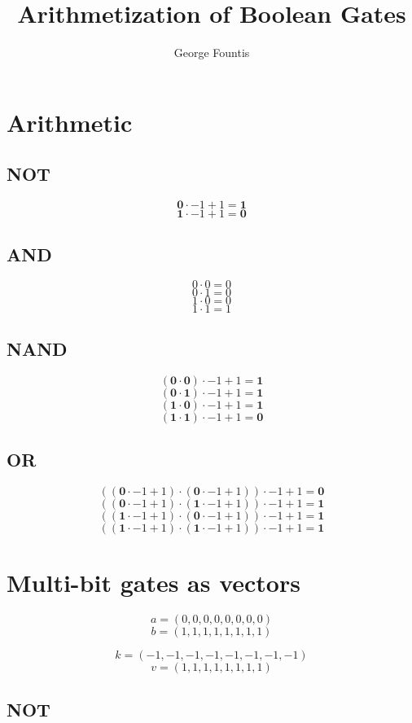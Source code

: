 \documentclass[11pt]{article} %
\title{Arithmetization of Boolean Gates}
\author{George Fountis}
\begin{document}
\maketitle

\section{Arithmetic}

\subsection{NOT}

$$ \textbf{0} \cdot  -1 + 1 = \textbf{1}$$
$$ \textbf{1} \cdot  -1 + 1 = \textbf{0}$$

\subsection{AND}

$$ 0 \cdot 0 = 0$$
$$ 0 \cdot 1 = 0$$
$$ 1 \cdot 0 = 0$$
$$ 1 \cdot 1 = 1$$

\subsection{NAND}
$$ (\textbf{0} \cdot \textbf{0}) \cdot -1+1 = \textbf{1}$$
$$ (\textbf{0} \cdot \textbf{1}) \cdot -1+1 = \textbf{1}$$
$$ (\textbf{1} \cdot \textbf{0}) \cdot -1+1 = \textbf{1}$$
$$ (\textbf{1} \cdot \textbf{1}) \cdot -1+1 = \textbf{0}$$

\subsection{OR}

$$ ((   \textbf{0}\cdot-1+1)  \cdot   (\textbf{0} \cdot -1+1))\cdot-1+1=\textbf{0}$$
$$ ((    \textbf{0}  \cdot-1+1)\cdot(  \textbf{1}  \cdot-1+1))\cdot-1+1=\textbf{1}$$
$$ ((    \textbf{1}  \cdot-1+1)\cdot(  \textbf{0}  \cdot-1+1))\cdot-1+1=\textbf{1}$$
$$ ((    \textbf{1}  \cdot-1+1)\cdot(   \textbf{1}   \cdot-1+1))\cdot-1+1=\textbf{1}$$


\newpage
\section{Multi-bit gates as vectors}
$$ a = (0,0,0,0,0,0,0,0)$$
$$ b = (1,1,1,1,1,1,1,1)$$

$$ k = (-1, -1, -1, -1, -1, -1, -1, -1)$$
$$ v = (1, 1, 1, 1, 1, 1, 1, 1)$$
\subsection{NOT}
\end{document}
